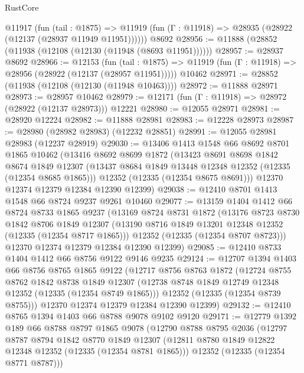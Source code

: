 \begin{lexlean}{RustCore}
\begin{coremodule}
    @11917
      (fun (tail : @1875) =>
      @11919 (fun (Γ : @11918) => @28935 (@28922 (@12137 (@28937 @11949 @11951))))))
    @8692
@28956 := @11888 (@28852 (@11938 (@12108 (@12130 (@11948 (@8693 @11951))))))
@28957 := @28937 @8692
@28966 := @12153
    (fun (tail : @1875) => @11919 (fun (Γ : @11918) => @28956 (@28922 (@12137 (@28957 @11951)))))
    @10462
@28971 := @28852 (@11938 (@12108 (@12130 (@11948 @10463))))
@28972 := @11888 @28971
@28973 := @28957 @10462
@28979 := @12171 (fun (Γ : @11918) => @28972 (@28922 (@12137 @28973))) @12221
@28980 := @12055 @28971
@28981 := @28920 @12224
@28982 := @11888 @28981
@28983 := @12228 @28973
@28987 := @28980 (@28982 @28983) (@12232 @28851)
@28991 := @12055 @28981 @28983 (@12237 @28919)
@29030 := @13406
    @1413
    @1548
    @66
    @8692
    @8701
    @1865
    @10462
    (@13416
      @8692
      @8699
      @1872
      (@13423
        @8691
        @8698
        @1842
        @8674
        @1849
        @12307
        (@13437 @8684 @1849 @13448 @12348 @12352 (@12335 (@12354 @8685 @1865)))
        @12352
        (@12335 (@12354 @8675 @8691)))
      @12370
      @12374
      @12379
      @12384
      @12390
      @12399)
@29038 := @12410 @8701 @1413 @1548 @66 @8724 @9237 @9261 @10460
@29077 := @13159
    @1404
    @1412
    @66
    @8724
    @8733
    @1865
    @9237
    (@13169
      @8724
      @8731
      @1872
      (@13176
        @8723
        @8730
        @1842
        @8706
        @1849
        @12307
        (@13190 @8716 @1849 @13201 @12348 @12352 (@12335 (@12354 @8717 @1865)))
        @12352
        (@12335 (@12354 @8707 @8723)))
      @12370
      @12374
      @12379
      @12384
      @12390
      @12399)
@29085 := @12410 @8733 @1404 @1412 @66 @8756 @9122 @9146 @9235
@29124 := @12707
    @1394
    @1403
    @66
    @8756
    @8765
    @1865
    @9122
    (@12717
      @8756
      @8763
      @1872
      (@12724
        @8755
        @8762
        @1842
        @8738
        @1849
        @12307
        (@12738 @8748 @1849 @12749 @12348 @12352 (@12335 (@12354 @8749 @1865)))
        @12352
        (@12335 (@12354 @8739 @8755)))
      @12370
      @12374
      @12379
      @12384
      @12390
      @12399)
@29132 := @12410 @8765 @1394 @1403 @66 @8788 @9078 @9102 @9120
@29171 := @12779
    @1392
    @189
    @66
    @8788
    @8797
    @1865
    @9078
    (@12790
      @8788
      @8795
      @2036
      (@12797
        @8787
        @8794
        @1842
        @8770
        @1849
        @12307
        (@12811 @8780 @1849 @12822 @12348 @12352 (@12335 (@12354 @8781 @1865)))
        @12352
        (@12335 (@12354 @8771 @8787)))

\end{coremodule}
\end{lexlean}
